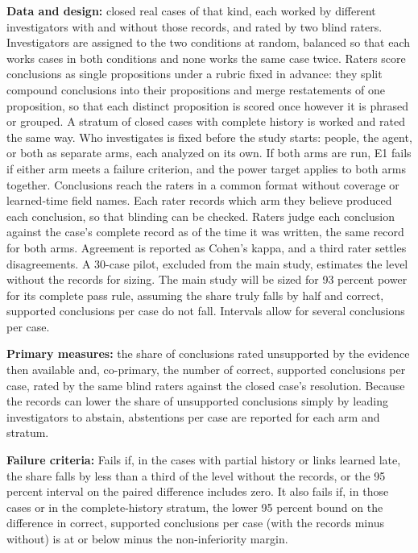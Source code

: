 \documentclass[
  11pt,
]{article}
\begin{document}
\textbf{Data and design:} closed real cases of that kind, each worked by
different investigators with and without those records, and rated by two
blind raters. Investigators are assigned to the two conditions at
random, balanced so that each works cases in both conditions and none
works the same case twice. Raters score conclusions as single
propositions under a rubric fixed in advance: they split compound
conclusions into their propositions and merge restatements of one
proposition, so that each distinct proposition is scored once however it
is phrased or grouped. A stratum of closed cases with complete history
is worked and rated the same way. Who investigates is fixed before the
study starts: people, the agent, or both as separate arms, each analyzed
on its own. If both arms are run, E1 fails if either arm meets a failure
criterion, and the power target applies to both arms together.
Conclusions reach the raters in a common format without coverage or
learned-time field names. Each rater records which arm they believe
produced each conclusion, so that blinding can be checked. Raters judge
each conclusion against the case's complete record as of the time it was
written, the same record for both arms. Agreement is reported as Cohen's
kappa, and a third rater settles disagreements. A 30-case pilot,
excluded from the main study, estimates the level without the records
for sizing. The main study will be sized for 93 percent power for its
complete pass rule, assuming the share truly falls by half and correct,
supported conclusions per case do not fall. Intervals allow for several
conclusions per case.

\textbf{Primary measures:} the share of conclusions rated unsupported by
the evidence then available and, co-primary, the number of correct,
supported conclusions per case, rated by the same blind raters against
the closed case's resolution. Because the records can lower the share of
unsupported conclusions simply by leading investigators to abstain,
abstentions per case are reported for each arm and stratum.

\textbf{Failure criteria:} Fails if, in the cases with partial history
or links learned late, the share falls by less than a third of the level
without the records, or the 95 percent interval on the paired difference
includes zero. It also fails if, in those cases or in the
complete-history stratum, the lower 95 percent bound on the difference
in correct, supported conclusions per case (with the records minus
without) is at or below minus the non-inferiority margin.
\end{document}
